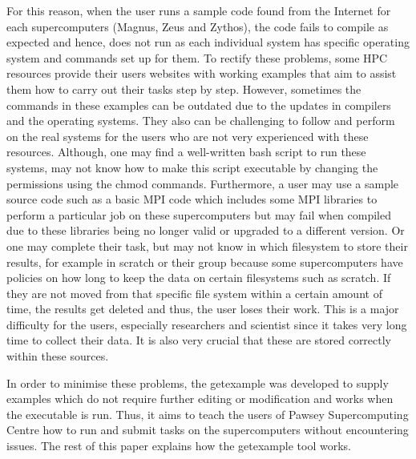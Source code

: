 For this reason, when the user runs a sample code found from the Internet for each supercomputers (Magnus, Zeus and Zythos), the code fails to compile 
as expected and hence, does not run as each individual system has specific operating system and commands set up for them. To rectify these problems, 
some HPC resources provide their users websites with working examples that aim to assist them how to carry out their tasks step by step. 
However, sometimes the commands in these examples can be outdated due to the updates in compilers and the operating systems. They also can be challenging 
to follow and perform on the real systems for the users who are not very experienced with these resources. Although, one may find a well-written bash 
script to run these systems, may not know how to make this script executable by changing the permissions using the chmod commands. Furthermore, a user 
may use a sample source code such as a basic MPI code which includes some MPI libraries to perform a particular job on these supercomputers but may 
fail when compiled due to these libraries being no longer valid or upgraded to a different version. Or one may complete their task, but may 
not know in which filesystem to store their results, for example in scratch or their group because some supercomputers have policies on how long to keep 
the data on certain filesystems such as scratch. If they are not moved from that specific file system within a certain amount of time, the results get 
deleted and thus, the user loses their work. This is a major difficulty for the users, especially researchers and scientist since it takes very long time 
to collect their data. It is also very crucial that these are stored correctly within these sources.

In order to minimise these problems, the getexample was developed to supply examples which do not require further editing or modification and works
when the executable is run. Thus, it aims to teach the users of Pawsey Supercomputing Centre how to run and submit tasks on the supercomputers without 
encountering issues. The rest of this paper explains how the getexample tool works.   




